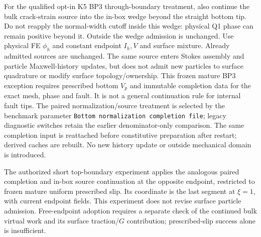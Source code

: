 \documentclass[11pt]{article}
\begin{document}
For the qualified opt-in K5 BP3 through-boundary treatment, also continue the bulk
crack-strain source into the in-box wedge beyond the straight bottom tip.
Do not reapply the normal-width cutoff inside this wedge: physical Q1 phase
can remain positive beyond it. Outside the wedge admission is unchanged.
Use physical FE $\phi_h$ and
constant endpoint $I_h,V$ and surface mixture. Already admitted sources are
unchanged. The same source enters Stokes assembly and particle Maxwell-history
updates, but does not admit new particles to surface quadrature or modify
surface topology/ownership. This frozen mature BP3 exception requires prescribed
bottom $V_p$ and immutable completion data for the exact mesh, phase and fault.
It is not a general continuation rule for internal fault tips. The paired
normalization/source treatment is selected by the benchmark parameter
\texttt{Bottom normalization completion file}; legacy diagnostic switches
retain the earlier denominator-only comparison. The same completion input is
reattached before constitutive preparation after restart; derived caches are
rebuilt. No new history update or outside mechanical domain is introduced.

The authorized short top-boundary experiment applies the analogous paired
completion and in-box source continuation at the opposite endpoint, restricted
to frozen mature uniform prescribed slip. Its coordinate is the last segment
at $\xi=1$, with current endpoint fields. This experiment does not revise
surface particle admission. Free-endpoint adoption requires a separate check
of the continued bulk virtual work and its surface traction/$G$ contribution;
prescribed-slip success alone is insufficient.
\end{document}
